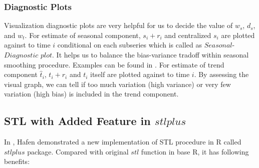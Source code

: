 \subsubsection{Diagnostic Plots}

Visualization diagnostic plots are very helpful for us to decide the value of 
$w_s$, $d_s$, and $w_t$. For estimate of seasonal component, $s_i + r_i$ and 
centralized $s_i$ are plotted against to time $i$ conditional on each subseries 
which is called as $Seasonal$-$Diagnostic$ $plot$. It helps us to balance the
bias-variance tradoff within seasonal smoothing procedure. Examples can be found
in \cite{Cleveland:1990}.
For estimate of trend component $\hat t_i$, $t_i + r_i$ and $t_i$ itself are 
plotted against to time $i$. By assessing the visual graph, we can tell if too
much variation (high variance) or very few variation (high bias) is included in
the trend component.

\subsection{STL with Added Feature in $stlplus$}

In \cite{hafen2010local}, Hafen demonstrated a new implementation of STL procedure
in R called $stlplus$ package. Compared with original $stl$ function in base R,
it has following benefits:


